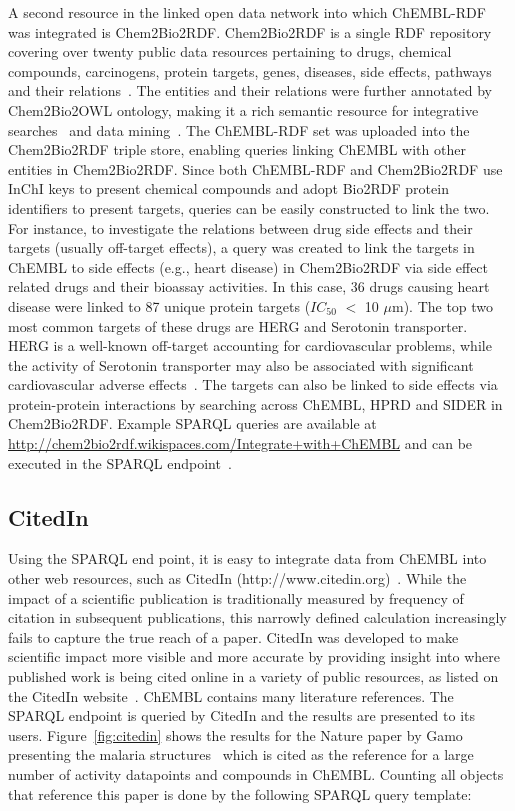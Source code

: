 \documentclass[10pt]{bmc_article}
\newenvironment{bmcformat}{\begin{raggedright}\baselineskip20pt\sloppy\setboolean{publ}{false}}{\end{raggedright}\baselineskip20pt\sloppy}
\begin{document}
\begin{bmcformat}
A second resource in the linked open data network into which ChEMBL-RDF was integrated is Chem2Bio2RDF.
Chem2Bio2RDF is a single RDF repository covering over twenty public data resources pertaining to drugs, chemical compounds, carcinogens,
protein targets, genes, diseases, side effects, pathways and their relations~\cite{Chen2010}. The entities and their relations were
further annotated by Chem2Bio2OWL ontology, making it a rich semantic resource for integrative searches~\cite{Chen2012a} and
data mining~\cite{Chen2012b}. The ChEMBL-RDF set was uploaded into the Chem2Bio2RDF triple store, enabling
queries linking ChEMBL with other entities in Chem2Bio2RDF. Since both ChEMBL-RDF and Chem2Bio2RDF use InChI keys to present chemical
compounds and adopt Bio2RDF protein identifiers to present targets, queries can be easily constructed to link the two. For instance,
to investigate the relations between drug side effects and their targets (usually off-target effects), a query was created to link the
targets in ChEMBL to side effects (e.g., heart disease) in Chem2Bio2RDF via side effect related drugs and their bioassay activities.
In this case, 36 drugs causing heart disease were linked to 87 unique protein targets ($IC_{50}$ $<$ 10 $\mu$m). The top two most common targets
of these drugs are HERG and Serotonin transporter. HERG is a well-known off-target accounting for cardiovascular problems, while
the activity of Serotonin transporter may also be associated with significant cardiovascular adverse effects~\cite{Levy2006}. 
The targets can also be linked to side effects via protein-protein interactions by searching across ChEMBL, HPRD and SIDER in
Chem2Bio2RDF. Example SPARQL queries are available at \url{http://chem2bio2rdf.wikispaces.com/Integrate+with+ChEMBL} and can be executed in the
SPARQL endpoint~\cite{Chen2010}.



\subsection*{CitedIn}

Using the SPARQL end point, it is easy to integrate data from ChEMBL into other web resources, such as CitedIn (http://www.citedin.org)~\cite{CitedIn2011}.
While the impact of a scientific publication is traditionally measured by frequency of citation in subsequent publications, this
narrowly defined calculation increasingly fails to capture the true reach of a paper. CitedIn was developed to make scientific
impact more visible and more accurate by providing insight into where published work is being cited online in a variety of public
resources, as listed on the CitedIn website~\cite{CitedResources}.
ChEMBL contains many literature references. The SPARQL endpoint is queried by CitedIn and the results are presented to its users.
Figure~\ref{fig:citedin} shows the results for the Nature paper by Gamo presenting the malaria structures~\cite{Gamo2010}
which is cited as the reference for a large number of activity datapoints and compounds in ChEMBL.
Counting all objects that reference this paper is done by the following SPARQL query template:


\end{bmcformat}
\end{document}

